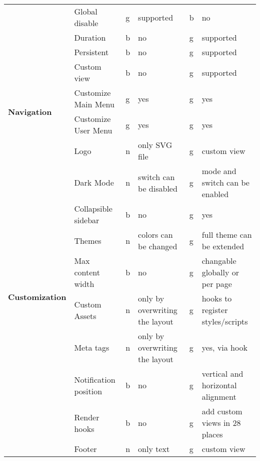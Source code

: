 \begin{table}[]
\begin{tabular}{llllll}
        & Global disable         & g  & supported                       & b  & no                                       \\
        & Duration               & b  & no                              & g  & supported                                \\
        & Persistent             & b  & no                              & g  & supported                                \\
        & Custom view            & b  & no                              & g  & supported                                \\
        \multirow{2}{*}{\textbf{Navigation}}     & Customize Main Menu    & g  & yes                             & g  & yes                                      \\
        & Customize User Menu    & g  & yes                             & g  & yes                                      \\
        \multirow{10}{*}{\textbf{Customization}} & Logo                   & n  & only SVG file                   & g  & custom view                              \\
        & Dark Mode              & n  & switch can be disabled          & g  & mode and switch can be enabled           \\
        & Collapsible sidebar    & b  & no                              & g  & yes                                      \\
        & Themes                 & n  & colors can be changed           & g  & full theme can be extended               \\
        & Max content width      & b  & no                              & g  & changable globally or per page           \\
        & Custom Assets          & n  & only by overwriting the layout  & g  & hooks to register styles/scripts         \\
        & Meta tags              & n  & only by overwriting the layout  & g  & yes, via hook                            \\
        & Notification position  & b  & no                              & g  & vertical and horizontal alignment        \\
        & Render hooks           & b  & no                              & g  & add custom views in 28 places            \\
        & Footer                 & n  & only text                       & g  & custom view                              \\

\end{tabular}
\end{table}
